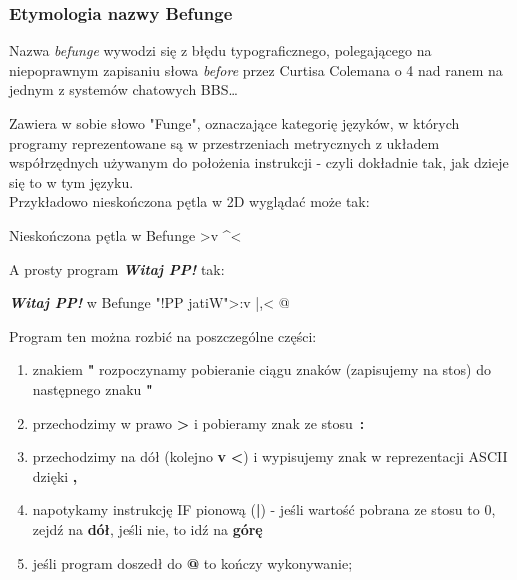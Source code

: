 \documentclass[fleqn,10pt]{SelfArx} %
\begin{document}
\subsubsection{Etymologia nazwy Befunge}
\par Nazwa \textit{befunge} wywodzi się z błędu typograficznego, polegającego na niepoprawnym zapisaniu słowa \textit{before} przez
Curtisa Colemana o 4 nad ranem na jednym z systemów chatowych BBS\cite{esolangWiki:befunge}\dots
\par Zawiera w sobie słowo "Funge", oznaczające kategorię języków, w których programy reprezentowane są w przestrzeniach metrycznych z układem
współrzędnych używanym do położenia instrukcji - czyli dokładnie tak, jak dzieje się to w tym języku.\\
Przykładowo nieskończona pętla w 2D wyglądać może tak:
\begin{sexylisting}{Nieskończona pętla w Befunge}
>v
^<
\end{sexylisting}
A prosty program \textbf{\textit{Witaj PP!}} tak:
\begin{sexylisting}{\textbf{\textit{Witaj PP!}} w Befunge}
"!PP jatiW">:v
           |,<
           @
\end{sexylisting}
Program ten można rozbić na poszczególne części:
\begin{enumerate}
	\item znakiem \textbf{"} rozpoczynamy pobieranie ciągu znaków (zapisujemy na stos) do następnego znaku \textbf{"}
	\item przechodzimy w prawo \textbf{>} i pobieramy znak ze stosu~\textbf{:}
	\item przechodzimy na dół (kolejno \textbf{v} \textbf{<}) i wypisujemy znak w reprezentacji ASCII dzięki \textbf{,}
	\item napotykamy instrukcję IF pionową (\textbf{|}) - jeśli wartość pobrana ze stosu to 0, zejdź na \textbf{dół}, jeśli nie, to idź na \textbf{górę}
	\item jeśli program doszedł do \textbf{@} to kończy wykonywanie;
\end{enumerate}
\end{document}
